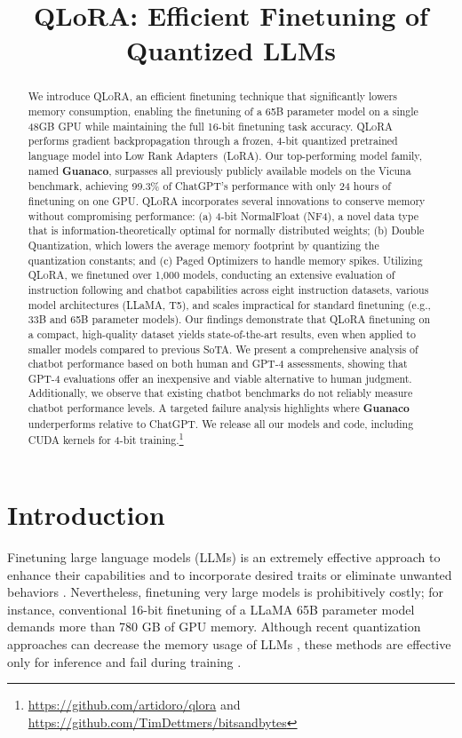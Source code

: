 \title{QLoRA: Efficient Finetuning of Quantized LLMs}

\begin{abstract}
We introduce \textsc{QLoRA}, an efficient finetuning technique that significantly lowers memory consumption, enabling the finetuning of a 65B parameter model on a single 48GB GPU while maintaining the full 16-bit finetuning task accuracy. \textsc{QLoRA} performs gradient backpropagation through a frozen, 4-bit quantized pretrained language model into Low Rank Adapters~(LoRA). Our top-performing model family, named \textbf{Guanaco}, surpasses all previously publicly available models on the Vicuna benchmark, achieving 99.3\% of ChatGPT’s performance with only 24 hours of finetuning on one GPU. \textsc{QLoRA} incorporates several innovations to conserve memory without compromising performance: (a) 4-bit NormalFloat (NF4), a novel data type that is information-theoretically optimal for normally distributed weights; (b) Double Quantization, which lowers the average memory footprint by quantizing the quantization constants; and (c) Paged Optimizers to handle memory spikes. Utilizing \textsc{QLoRA}, we finetuned over 1,000 models, conducting an extensive evaluation of instruction following and chatbot capabilities across eight instruction datasets, various model architectures (LLaMA, T5), and scales impractical for standard finetuning (e.g., 33B and 65B parameter models). Our findings demonstrate that QLoRA finetuning on a compact, high-quality dataset yields state-of-the-art results, even when applied to smaller models compared to previous SoTA. We present a comprehensive analysis of chatbot performance based on both human and GPT-4 assessments, showing that GPT-4 evaluations offer an inexpensive and viable alternative to human judgment. Additionally, we observe that existing chatbot benchmarks do not reliably measure chatbot performance levels. A targeted failure analysis highlights where \textbf{Guanaco} underperforms relative to ChatGPT. We release all our models and code, including CUDA kernels for 4-bit training.\footnote{\url{https://github.com/artidoro/qlora} and \url{https://github.com/TimDettmers/bitsandbytes}}
\end{abstract}

\section{Introduction}

Finetuning large language models (LLMs) is an extremely effective approach to enhance their capabilities \citep{min2021metaicl, wei2021finetuned, ouyang2022training, wang2022super, wang2022self, liu2022few} and to incorporate desired traits or eliminate unwanted behaviors \citep{ouyang2022training,askell2021general,bai2022training}. Nevertheless, finetuning very large models is prohibitively costly; for instance, conventional 16-bit finetuning of a LLaMA 65B parameter model~\citep{touvron2023llama} demands more than 780 GB of GPU memory. Although recent quantization approaches can decrease the memory usage of LLMs \citep{dettmers2022llm, dettmers2022case, frantar2022gptq, xiao2022smoothquant}, these methods are effective only for inference and fail during training \citep{wortsman2023stable}.

